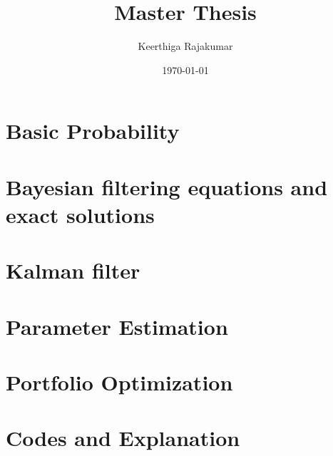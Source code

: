 \documentclass{article}
\title{Master Thesis}
\author{Keerthiga Rajakumar}
\date{\today}
\theoremstyle{plain} %
\theoremstyle{definition} %
\theoremstyle{remark} %
\begin{document}

\maketitle
\newpage

\tableofcontents %

\newpage

\setcounter{page}{1} %

\section{Basic Probability}


\newpage
\section{Bayesian filtering equations and exact solutions}


\newpage
\section{Kalman filter}


\newpage
\section{Parameter Estimation}


\newpage
\section{Portfolio Optimization}


\newpage
\section*{Codes and Explanation}

\end{document}
